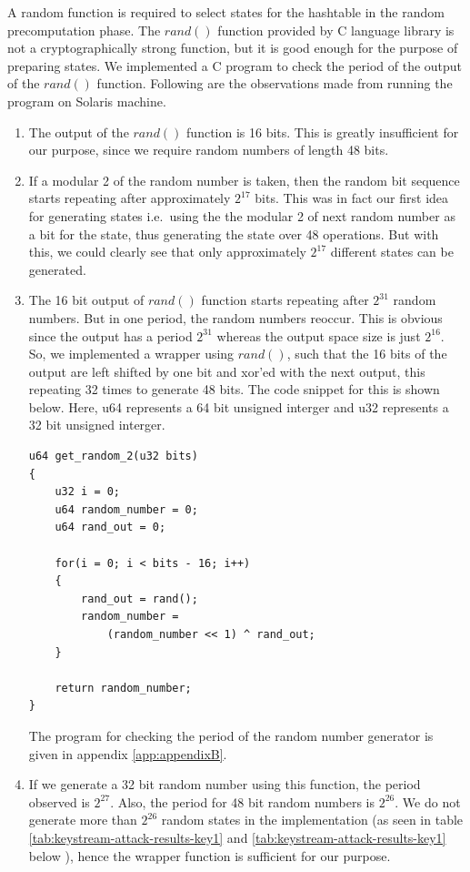 A random function is required to select states for the hashtable in the random precomputation phase. The $rand()$ function provided by C language library is not a cryptographically strong function, but it is good enough for the purpose of preparing states. We implemented a C program to check the period of the output of the $rand()$ function. Following are the observations made from running the program on Solaris machine.

\begin{enumerate}
\item The output of the $rand()$ function is 16 bits. This is greatly insufficient for our purpose, since we require random numbers of length 48 bits.
\item If a modular 2 of the random number is taken, then the random bit sequence starts repeating after approximately $2^{17}$ bits. This was in fact our first idea for generating states i.e.~using the the modular 2 of next random number as a bit for the state, thus generating the state over 48 operations. But with this, we could clearly see that only approximately $2^{17}$ different states can be generated.
\item The 16 bit output of $rand()$ function starts repeating after $2^{31}$ random numbers. But in one period, the random numbers reoccur. This is obvious since the output has a period $2^{31}$ whereas the output space size is just $2^{16}$. So, we implemented a wrapper using $rand()$, such that the 16 bits of the output are left shifted by one bit and xor'ed with the next output, this repeating 32 times to generate 48 bits. The code snippet for this is shown below. Here, u64 represents a 64 bit unsigned interger and u32 represents a 32 bit unsigned interger.
\begin{lstlisting}[frame=tb]
u64 get_random_2(u32 bits)
{
	u32 i = 0;
	u64 random_number = 0;
	u64 rand_out = 0;

	for(i = 0; i < bits - 16; i++)
	{
		rand_out = rand();
		random_number = 
			(random_number << 1) ^ rand_out;
	}

	return random_number;
}
\end{lstlisting}
The program for checking the period of the random number generator is given in appendix \ref{app:appendixB}.
\item If we generate a 32 bit random number using this function, the period observed is $2^{27}$. Also, the period for 48 bit random numbers is $2^{26}$. We do not generate more than $2^{26}$ random states in the implementation (as seen in table \ref{tab:keystream-attack-results-key1} and \ref{tab:keystream-attack-results-key1} below ), hence the wrapper function is sufficient for our purpose.
\end{enumerate}

